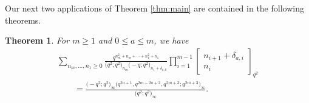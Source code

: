 \documentclass[pdftex]{sigma}
\newtheorem{Theorem}{Theorem}[section]
\numberwithin{equation}{section}
\begin{document}
Our next two applications of Theorem \ref{thm:main} are contained in the following theorems.

\begin{Theorem} \label{q^2thm}
	For $m \geq 1$ and $0 \leq a \leq {m}$, we have
	\begin{gather}
			\sum_{n_m,\dots ,n_1 \geq 0} \frac{q^{n_m^2+n_m + \cdots + n_1^2+n_1}}{\bigl(q^2;q^2\bigr)_{n_m} \bigl(-q;q^2\bigr)_{n_1 + \delta_{a,0}}} \prod_{i=1}^{m-1} \begin{bmatrix} n_{i+1} + \delta_{a,i} \\ n_i \end{bmatrix}_{q^2} \nonumber\\
			\qquad{} = \frac{\bigl(-q^2;q^2\bigr)_{\infty}\bigl(q^{2a+1},q^{2m-2a+2},q^{2m+3};q^{2m+3}\bigr)_{\infty}}{\bigl(q^2;q^2\bigr)_{\infty}}. \label{q^2eq}
	\end{gather}
\end{Theorem}
\end{document}
